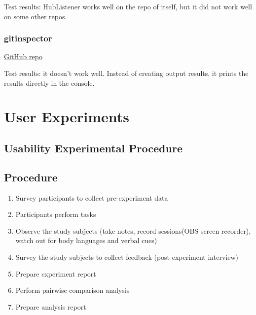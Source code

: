 \documentclass[letterpaper,cleveref]{lipics-v2019}
\theoremstyle{definition}
\begin{document}
Test results: HubListener works well on the repo of itself, but it did not work
well on some other repos.

\subsubsection{gitinspector}
\href{https://github.com/ejwa/gitinspector}{GitHub repo}

Test results: it doesn't work well. Instead of creating output results, it
prints the results directly in the console.

\section{User Experiments}
\subsection{Usability Experimental Procedure}

\subsection {Procedure}
\begin {enumerate}

\item Survey participants to collect pre-experiment data
\item Participants perform tasks
\item Observe the study subjects (take notes, record sessions(OBS screen recorder), watch out for body languages and verbal cues)
\item Survey the study subjects to collect feedback (post experiment interview)
\item Prepare experiment report
\item Perform pairwise comparison analysis
\item Prepare analysis report
\end {enumerate}
\end{document}
